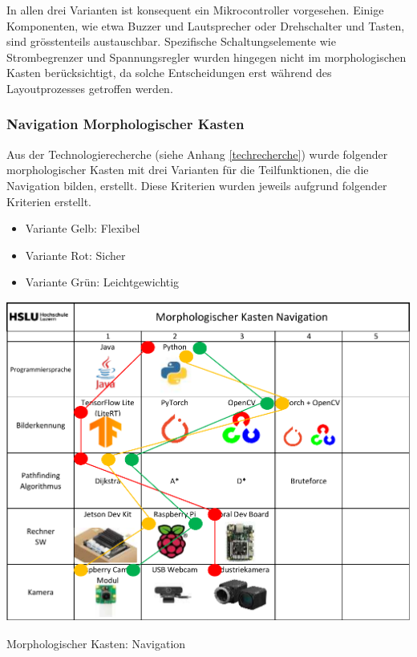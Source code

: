 In allen drei Varianten ist konsequent ein Mikrocontroller vorgesehen. Einige Komponenten, wie etwa Buzzer und Lautsprecher oder Drehschalter und Tasten, sind grösstenteils austauschbar. Spezifische Schaltungselemente wie Strombegrenzer und Spannungsregler wurden hingegen nicht im morphologischen Kasten berücksichtigt, da solche Entscheidungen erst während des Layoutprozesses getroffen werden.


\subsubsection{Navigation Morphologischer Kasten}

Aus der Technologierecherche (siehe Anhang \ref{techrecherche}) wurde folgender morphologischer Kasten mit drei Varianten für die Teilfunktionen, die die Navigation bilden, erstellt.  Diese Kriterien wurden jeweils aufgrund folgender Kriterien erstellt.

\begin{itemize}
    \item Variante Gelb: Flexibel
    \item Variante Rot: Sicher
    \item Variante Grün: Leichtgewichtig
\end{itemize}

\begin{table}[H]
\centering
\includegraphics[width=\textwidth]{assets/MK_Informatik.pdf}
\caption{Morphologischer Kasten: Navigation}
\label{table:mk-informatik}
\end{table}


